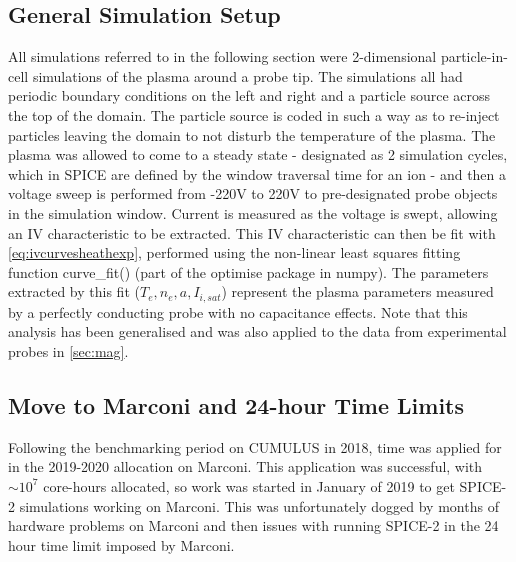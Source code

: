 \documentclass[a4paper, 12pt]{article} %
\begin{document}
\subsection{\label{ssec:sim_setup}General Simulation Setup}
	All simulations referred to in the following section were 2-dimensional particle-in-cell simulations of the plasma around a probe tip.
	The simulations all had periodic boundary conditions on the left and right and a particle source across the top of the domain. 
	The particle source is coded in such a way as to re-inject particles leaving the domain to not disturb the temperature of the plasma.
	The plasma was allowed to come to a steady state - designated as 2 simulation cycles, which in SPICE are defined by the window traversal time for an ion - and then a voltage sweep is performed from -220V to 220V to pre-designated probe objects in the simulation window. 
	Current is measured as the voltage is swept, allowing an IV characteristic to be extracted.
	This IV characteristic can then be fit with \cref{eq:ivcurvesheathexp}, performed using the non-linear least squares fitting function curve\_fit() (part of the optimise package in numpy).
	The parameters extracted by this fit ($T_e, n_e, a, I_{i, sat}$) represent the plasma parameters measured by a perfectly conducting probe with no capacitance effects. 
	Note that this analysis has been generalised \cite{LelandGithub} and was also applied to the data from experimental probes in \cref{sec:mag}.

\subsection{\label{ssec:marconi}Move to Marconi and 24-hour Time Limits}
    Following the benchmarking period on CUMULUS in 2018, time was applied for in the 2019-2020 allocation on Marconi. 
    This application was successful, with $\sim10^{7}$ core-hours allocated, so work was started in January of 2019 to get SPICE-2 simulations working on Marconi.
    This was unfortunately dogged by months of hardware problems on Marconi and then issues with running SPICE-2 in the 24 hour time limit imposed by Marconi.
    
\end{document}
